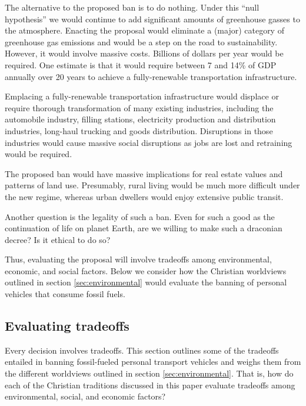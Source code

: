 \documentclass[12pt]{article}
\begin{document}
The alternative to the proposed ban is to do nothing. 
Under this ``null hypothesis'' we would continue to add significant amounts of greenhouse gasses to the atmosphere.
Enacting the proposal would eliminate a (major) category of greenhouse gas emissions and would be a step on the road to sustainability.
However, it would involve massive costs. Billions of dollars per year would be required. 
One estimate is that it would require between 7 and 14\% of GDP annually 
over 20 years to achieve a fully-renewable transportation infrastructure.

Emplacing a fully-renewable transportation infrastructure 
would displace or require thorough transformation of many existing industries, 
including the automobile industry,  filling stations, 
electricity production and distribution industries, 
long-haul trucking and goods distribution. %
Disruptions in those industries 
would cause massive social disruptions 
as jobs are lost and retraining would be required.

The proposed ban would have massive implications for real estate values 
and patterns of land use. 
Presumably, rural living would be much more difficult under the new regime,
whereas urban dwellers would enjoy extensive public transit.

Another question is the legality of such a ban. 
Even for such a good as the continuation of life on planet Earth,
are we willing to make such a draconian decree? Is it ethical to do so?

Thus, evaluating the proposal will involve tradeoffs among environmental, economic, and social factors.
Below we consider how the Christian worldviews outlined in section \ref{sec:environmental}
would evaluate the banning of personal vehicles that consume fossil fuels.


\subsection{Evaluating tradeoffs}
\label{sec:evaluating_tradeoffs}
Every decision involves tradeoffs. This section outlines some of the tradeoffs entailed in banning fossil-fueled personal transport vehicles 
and weighs them from the different worldviews outlined in section \ref{sec:environmental}.
That is, how do each of the Christian traditions discussed in this paper 
evaluate tradeoffs among environmental, social, and economic factors?
\end{document}
